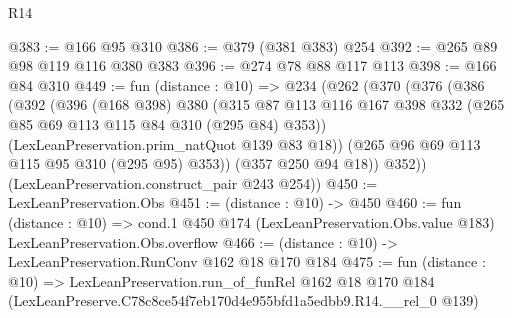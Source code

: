 \begin{lexlean}{R14}
\begin{coremodule}
@383 := @166 @95 @310
@386 := @379 (@381 @383) @254
@392 := @265 @89 @98 @119 @116 @380 @383
@396 := @274 @78 @88 @117 @113
@398 := @166 @84 @310
@449 := fun (distance : @10) =>
  @234
    (@262
      (@370
        (@376
          (@386
            (@392
              (@396
                (@168 @398)
                @380
                (@315
                  @87
                  @113
                  @116
                  @167
                  @398
                  @332
                  (@265 @85 @69 @113 @115 @84 @310 (@295 @84) @353))
                (LexLeanPreservation.prim_natQuot @139 @83 @18))
              (@265 @96 @69 @113 @115 @95 @310 (@295 @95) @353))
            (@357 @250 @94 @18))
          @352))
      (LexLeanPreservation.construct_pair @243 @254))
@450 := LexLeanPreservation.Obs
@451 := (distance : @10) -> @450
@460 := fun (distance : @10) =>
  cond.{1} @450 @174 (LexLeanPreservation.Obs.value @183) LexLeanPreservation.Obs.overflow
@466 := (distance : @10) -> LexLeanPreservation.RunConv @162 @18 @170 @184
@475 := fun (distance : @10) =>
  LexLeanPreservation.run_of_funRel
    @162
    @18
    @170
    @184
    (LexLeanPreserve.C78c8ce54f7eb170d4e955bfd1a5edbb9.R14.__rel_0 @139)
\end{coremodule}
\end{lexlean}
